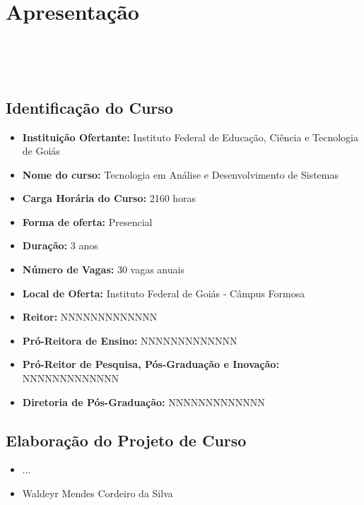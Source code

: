 \documentclass[11pt,fleqn]{book} %
\begin{document}
\renewcommand\contentsname{Sumário}
\tableofcontents

\chapter{Apresentação}\label{apresentacao}
\vspace{6em}
\begin{flushright}
	\textit{\textcolor{white}{Um bonita citação...}}
\end{flushright}
\vspace{12em}

~\parencite{Resolucao3De2002}


\newpage  
\section{Identificação do Curso}
\begin{itemize}
	\item \textbf{Instituição Ofertante:} Instituto Federal de Educação, Ciência e Tecnologia de Goiás
	\item \textbf{Nome do curso:} Tecnologia em Análise e Desenvolvimento de Sistemas
	\item \textbf{Carga Horária do Curso:} 2160 horas
	\item \textbf{Forma de oferta:} Presencial
	\item \textbf{Duração:} 3 anos
	\item \textbf{Número de Vagas:} 30 vagas anuais
	\item \textbf{Local de Oferta:} Instituto Federal de Goiás - Câmpus Formosa
	\item \textbf{Reitor:} NNNNNNNNNNNNN
	\item \textbf{Pró-Reitora de Ensino:} NNNNNNNNNNNNN
	\item \textbf{Pró-Reitor de Pesquisa, Pós-Graduação e Inovação:} NNNNNNNNNNNNN
	\item \textbf{Diretoria de Pós-Graduação:} NNNNNNNNNNNNN
\end{itemize}

\section{Elaboração do Projeto de Curso}
\begin{itemize}[label=\bfseries]
	\item ...
	\item Waldeyr Mendes Cordeiro da Silva
\end{itemize}
\end{document}
